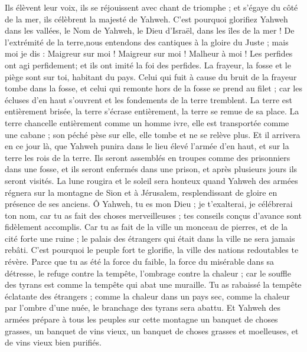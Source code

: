 \begin{multicols}{2}
Ils élèvent leur voix, ils se réjouissent avec chant de triomphe ; et s'égaye du côté de la mer, ils célèbrent la majesté de Yahweh.
C'est pourquoi glorifiez Yahweh dans les vallées, le Nom de Yahweh, le Dieu d'Israël, dans les îles de la mer !
De l'extrémité de la terre,nous entendons des cantiques à la gloire du Juste ; mais moi je dis : Maigreur sur moi ! Maigreur sur moi ! Malheur à moi ! Les perfides ont agi perfidement; et ils ont imité la foi des perfides.
La frayeur, la fosse et le piège sont sur toi, habitant du pays.
Celui qui fuit à cause du bruit de la frayeur tombe dans la fosse, et celui qui remonte hors de la fosse se prend au filet ; car les écluses d'en haut s'ouvrent et les fondements de la terre tremblent.
La terre est entièrement brisée, la terre s'écrase entièrement, la terre se remue de sa place.
La terre chancelle entièrement comme un homme ivre, elle est transportée comme une cabane ; son péché pèse sur elle, elle tombe et ne se relève plus.
Et il arrivera en ce jour là, que Yahweh punira dans le lieu élevé l'armée d'en haut, et sur la terre les rois de la terre.
Ils seront assemblés en troupes comme des prisonniers dans une fosse, et ils seront enfermés dans une prison, et après plusieurs jours ils seront visités.
La lune rougira et le soleil sera honteux quand Yahweh des armées régnera sur la montagne de Sion et à Jérusalem, resplendissant de gloire en présence de ses anciens.
\VerseOne{}Ô Yahweh, tu es mon Dieu ; je t'exalterai, je célébrerai ton nom, car tu as fait des choses merveilleuses ; tes conseils conçus d'avance sont fidèlement accomplis.
Car tu as fait de la ville un monceau de pierres, et de la cité forte une ruine ; le palais des étrangers qui était dans la ville ne sera jamais rebâti.
C'est pourquoi le peuple fort te glorifie, la ville des nations redoutables te révère.
Parce que tu as été la force du faible, la force du misérable dans sa détresse, le refuge contre la tempête, l'ombrage contre la chaleur ; car le souffle des tyrans est comme la tempête qui abat une muraille.
Tu as rabaissé la tempête éclatante des étrangers ; comme la chaleur dans un pays sec, comme la chaleur par l'ombre d'une nuée, le branchage des tyrans sera abattu.
Et Yahweh des armées prépare à tous les peuples sur cette montagne un banquet de choses grasses, un banquet de vins vieux, un  banquet de choses grasses et moelleuses, et de vins vieux bien purifiés.

\end{multicols}
